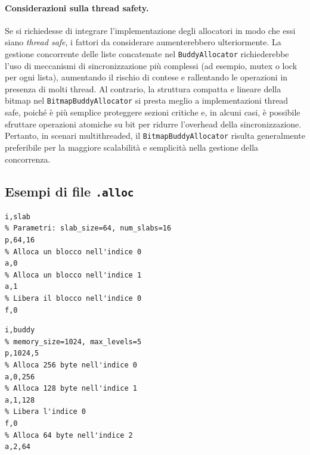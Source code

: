 \paragraph{Considerazioni sulla thread safety.}
Se si richiedesse di integrare l'implementazione degli allocatori in modo che essi siano \textit{thread safe}, i fattori da considerare aumenterebbero ulteriormente. La gestione concorrente delle liste concatenate nel \texttt{BuddyAllocator} richiederebbe l'uso di meccanismi di sincronizzazione più complessi (ad esempio, mutex o lock per ogni lista), aumentando il rischio di contese e rallentando le operazioni in presenza di molti thread. Al contrario, la struttura compatta e lineare della bitmap nel \texttt{BitmapBuddyAllocator} si presta meglio a implementazioni thread safe, poiché è più semplice proteggere sezioni critiche e, in alcuni casi, è possibile sfruttare operazioni atomiche su bit per ridurre l'overhead della sincronizzazione. Pertanto, in scenari multithreaded, il \texttt{BitmapBuddyAllocator} risulta generalmente preferibile per la maggiore scalabilità e semplicità nella gestione della concorrenza.

\pagebreak

\subsection{Esempi di file \texttt{.alloc}}
\begin{lstlisting}[language={}]
% Tipo di allocatore (Slab)
i,slab         
% Parametri: slab_size=64, num_slabs=16
p,64,16        
% Alloca un blocco nell'indice 0
a,0            
% Alloca un blocco nell'indice 1
a,1            
% Libera il blocco nell'indice 0
f,0      
\end{lstlisting}      
\begin{lstlisting}[language={}]
% Benchmark per allocatore variabile
i,buddy
% memory_size=1024, max_levels=5
p,1024,5       
% Alloca 256 byte nell'indice 0
a,0,256        
% Alloca 128 byte nell'indice 1
a,1,128        
% Libera l'indice 0
f,0            
% Alloca 64 byte nell'indice 2
a,2,64         
\end{lstlisting}
\pagebreak




